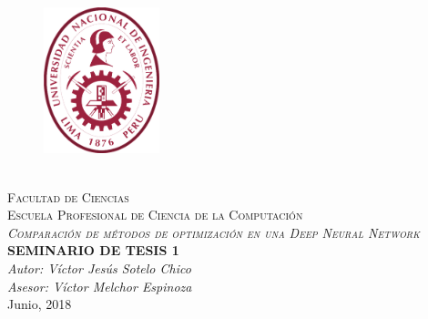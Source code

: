 \documentclass[12pt,spanish, singlespacing,]{MastersDoctoralThesis}
\author{}
\newcommand\blankpage{%
    \null
    \thispagestyle{empty}%
    \addtocounter{page}{0}%
    \newpage}
\begin{document}
\frontmatter 
\pagestyle{plain} 
\begin{titlepage}
\begin{center}

\begin{figure}[h]
\centering
\includegraphics[width=0.3\textwidth]{Figures/log_uni.png}
\end{figure}

\textsc{\huge \univname}\\[0.3cm]
\textsc{\Large Facultad de Ciencias}\\[0.2cm]
\textsc{\large Escuela Profesional de Ciencia de la Computaci\'on}\\[2cm]
\textsc{\LARGE \textit{Comparación de métodos de optimización en una Deep Neural Network}}\\[2cm] 
{\Large \textbf{SEMINARIO DE TESIS 1}}
{\huge \bfseries \ttitle}\\[2cm] 

\bigskip
\bigskip
\large\emph{Autor: Víctor Jesús Sotelo Chico}
{\authorname}\\ 
\large\emph{Asesor: Víctor Melchor Espinoza}
{\supname} 
\\[1cm]
{\large Junio, 2018}\\[4cm] 
 
\vfill
\end{center}
\end{titlepage}
\afterpage{\blankpage}
\begin{abstract}
\addchaptertocentry{\abstractname}


\end{abstract}
\end{document}
